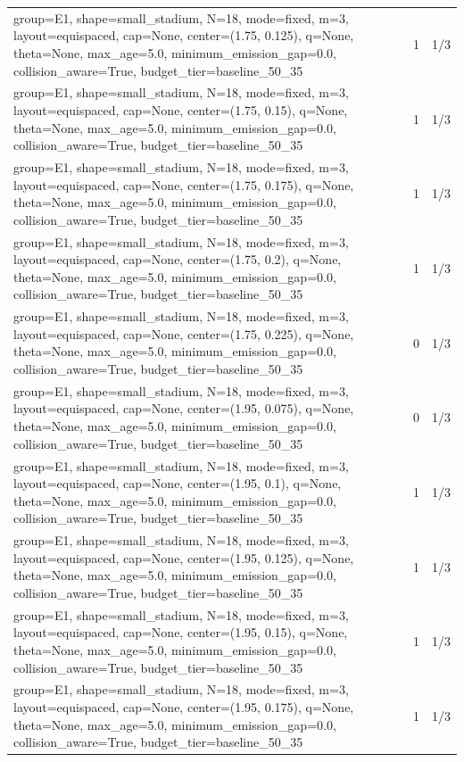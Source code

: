 \begin{tabular}{p{11cm}rr}
group=E1, shape=small\_stadium, N=18, mode=fixed, m=3, layout=equispaced, cap=None, center=(1.75, 0.125), q=None, theta=None, max\_age=5.0, minimum\_emission\_gap=0.0, collision\_aware=True, budget\_tier=baseline\_50\_35 & 1 & 1/3 \\
group=E1, shape=small\_stadium, N=18, mode=fixed, m=3, layout=equispaced, cap=None, center=(1.75, 0.15), q=None, theta=None, max\_age=5.0, minimum\_emission\_gap=0.0, collision\_aware=True, budget\_tier=baseline\_50\_35 & 1 & 1/3 \\
group=E1, shape=small\_stadium, N=18, mode=fixed, m=3, layout=equispaced, cap=None, center=(1.75, 0.175), q=None, theta=None, max\_age=5.0, minimum\_emission\_gap=0.0, collision\_aware=True, budget\_tier=baseline\_50\_35 & 1 & 1/3 \\
group=E1, shape=small\_stadium, N=18, mode=fixed, m=3, layout=equispaced, cap=None, center=(1.75, 0.2), q=None, theta=None, max\_age=5.0, minimum\_emission\_gap=0.0, collision\_aware=True, budget\_tier=baseline\_50\_35 & 1 & 1/3 \\
group=E1, shape=small\_stadium, N=18, mode=fixed, m=3, layout=equispaced, cap=None, center=(1.75, 0.225), q=None, theta=None, max\_age=5.0, minimum\_emission\_gap=0.0, collision\_aware=True, budget\_tier=baseline\_50\_35 & 0 & 1/3 \\
group=E1, shape=small\_stadium, N=18, mode=fixed, m=3, layout=equispaced, cap=None, center=(1.95, 0.075), q=None, theta=None, max\_age=5.0, minimum\_emission\_gap=0.0, collision\_aware=True, budget\_tier=baseline\_50\_35 & 0 & 1/3 \\
group=E1, shape=small\_stadium, N=18, mode=fixed, m=3, layout=equispaced, cap=None, center=(1.95, 0.1), q=None, theta=None, max\_age=5.0, minimum\_emission\_gap=0.0, collision\_aware=True, budget\_tier=baseline\_50\_35 & 1 & 1/3 \\
group=E1, shape=small\_stadium, N=18, mode=fixed, m=3, layout=equispaced, cap=None, center=(1.95, 0.125), q=None, theta=None, max\_age=5.0, minimum\_emission\_gap=0.0, collision\_aware=True, budget\_tier=baseline\_50\_35 & 1 & 1/3 \\
group=E1, shape=small\_stadium, N=18, mode=fixed, m=3, layout=equispaced, cap=None, center=(1.95, 0.15), q=None, theta=None, max\_age=5.0, minimum\_emission\_gap=0.0, collision\_aware=True, budget\_tier=baseline\_50\_35 & 1 & 1/3 \\
group=E1, shape=small\_stadium, N=18, mode=fixed, m=3, layout=equispaced, cap=None, center=(1.95, 0.175), q=None, theta=None, max\_age=5.0, minimum\_emission\_gap=0.0, collision\_aware=True, budget\_tier=baseline\_50\_35 & 1 & 1/3 \\

\end{tabular}
